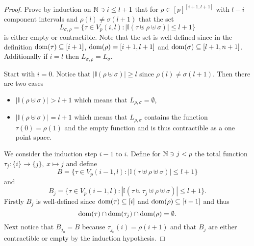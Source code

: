 \begin{proof}
  Prove by induction on $\mathbb{N} \ni i \leq l+1$ that for $\rho \in [p]^{[i+1,l+1]}$ with $l-i$ component intervals and $\rho(l) \neq \sigma(l+1)$ that the set \[L_{\sigma,\rho} = \{\tau \in V_p(i,l)\colon \left|\mathbb{I}(\tau \uplus \rho \uplus \sigma)\right| \leq l + 1 \}\]
  is either empty or contractible. Note that the set is well-defined since in the definition ${\rm dom}(\tau) \subseteq [i+1]$, ${\rm dom}(\rho) = [i+1,l+1]$ and ${\rm dom}(\sigma) \subseteq [l+1,n+1]$. Additionally if $i = l$ then $L_{\sigma,\rho} = L_{\sigma}$.

  Start with $i=0$. Notice that $\left|\mathbb{I}(\rho \uplus \sigma)\right| \geq l$ since $\rho(l) \neq \sigma(l+1)$. Then there are two cases
  \begin{itemize}
    \item $\left|\mathbb{I}(\rho \uplus \sigma)\right| > l+1$ which means that $L_{\rho, \sigma} = \emptyset$,
    \item $\left|\mathbb{I}(\rho \uplus \sigma)\right| = l+1$ which means that $L_{\rho,\sigma}$ contains the function $\tau(0) = \rho(1)$ and the empty function and is thus contractible as a one point space.
  \end{itemize}

  We consider the induction step $i-1$ to $i$. Define for $\mathbb{N} \ni j < p$ the total function $\tau_j\colon\{i\} \to \{j\}, \: x \mapsto j$ and define
  \begin{equation*}
    B = \{\tau \in V_p(i-1,l)\colon \left| \mathbb{I}(\tau \uplus \rho \uplus \sigma) \right| \leq l+1\}
  \end{equation*}
  and
  \begin{equation*}
    B_j = \{\tau \in V_p(i-1,l)\colon \left| \mathbb{I}(\tau \uplus \tau_j \uplus \rho \uplus \sigma) \right| \leq l+1\}.
  \end{equation*}
  Firstly $B_j$ is well-defined since ${\rm dom}(\tau) \subseteq [i]$ and ${\rm dom}(\rho) \subseteq [i+1]$ and thus \[{\rm dom}(\tau) \cap {\rm dom}(\tau_j) \cap {\rm dom}(\rho) = \emptyset.\] Next notice that $B_{j_0} = B$ because $\tau_{j_0}(i) = \rho(i+1)$ and that $B_j$ are either contractible or empty by the induction hypothesis.


\end{proof}

